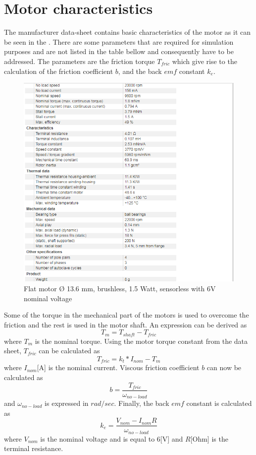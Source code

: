 \chapter{Motor characteristics}\label{chap: motorDatasheet}
%
The manufacturer data-sheet contains basic characteristics of the motor as it can be seen in the . There are some parameters that are required for simulation purposes and are not listed in the table bellow and consequently have to be addressed. The parameters are the friction torque $T_{fric}$ which give rise to the calculation of the friction coefficient $b$, and the back $emf$ constant $k_{e}$.     
%
\begin{figure}[H]
	\centering
	\includegraphics[width=0.7\linewidth]{figures/motorchar}
	\caption{ Flat motor $Ø$ 13.6 mm, brushless, 1.5 Watt, sensorless with 6V nominal voltage}
	\label{fig:323}
\end{figure}
%
%
Some of the torque in the mechanical part of the motors is used to overcome the friction and the rest is used in the motor shaft. An expression can be derived as
 \begin{equation*}
 T_{m} = T_{shaft} - T_{fric}
 \end{equation*}
  where $T_{m}$ is the nominal torque. Using the motor torque constant from the data sheet, $T_{fric}$ can be calculated as 
 \begin{equation*}
 T_{fric}	= k_{t}*I_{nom} - T_{m} 
 \end{equation*}    
where $I_{nom} $[A] is the nominal current. Viscous friction coefficient $b$ can now be calculated as
\begin{equation*}
	b	= \frac{T_{fric} }{\omega_{no-load}}
\end{equation*}
and $\omega_{no-load}$ is expressed in $rad/sec$. Finally, the back $emf$ constant is calculated as
\begin{equation*}
	k_{e}	= \frac{V_{nom} - I_{nom}R}{\omega_{no-load}}
\end{equation*}
where $V_{nom}$ is the nominal voltage and is equal to 6[V] and  $R$[Ohm] is the terminal resistance. 